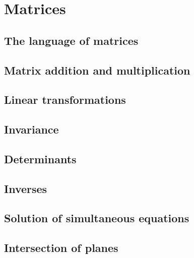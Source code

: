 \chapter{Matrices}
\section{The language of matrices}
\section{Matrix addition and multiplication}
\section{Linear transformations}
\section{Invariance}
\section{Determinants}
\section{Inverses}
\section{Solution of simultaneous equations}
\section{Intersection of planes}